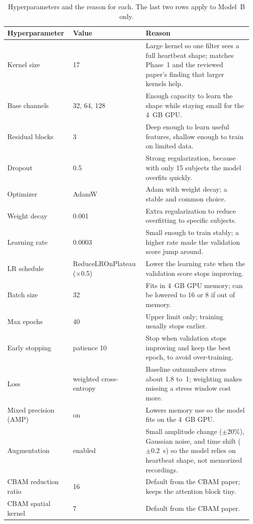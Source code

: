 \documentclass[conference]{IEEEtran}
\begin{document}
\begin{table}[t]
\caption{Hyperparameters and the reason for each. The last two rows apply to
Model~B only.}
\label{tab:hparams}
\centering
\footnotesize
\begin{tabular}{|l|l|p{11cm}|}
\hline
\textbf{Hyperparameter} & \textbf{Value} & \textbf{Reason} \\
\hline
Kernel size & 17 & Large kernel so one filter sees a full heartbeat shape; matches Phase~1 and the reviewed paper's finding that larger kernels help. \\
\hline
Base channels & 32, 64, 128 & Enough capacity to learn the shape while staying small for the 4~GB GPU. \\
\hline
Residual blocks & 3 & Deep enough to learn useful features, shallow enough to train on limited data. \\
\hline
Dropout & 0.5 & Strong regularization, because with only 15 subjects the model overfits quickly. \\
\hline
Optimizer & AdamW & Adam with weight decay; a stable and common choice. \\
\hline
Weight decay & 0.001 & Extra regularization to reduce overfitting to specific subjects. \\
\hline
Learning rate & 0.0003 & Small enough to train stably; a higher rate made the validation score jump around. \\
\hline
LR schedule & ReduceLROnPlateau ($\times$0.5) & Lower the learning rate when the validation score stops improving. \\
\hline
Batch size & 32 & Fits in 4~GB GPU memory; can be lowered to 16 or 8 if out of memory. \\
\hline
Max epochs & 40 & Upper limit only; training usually stops earlier. \\
\hline
Early stopping & patience 10 & Stop when validation stops improving and keep the best epoch, to avoid over-training. \\
\hline
Loss & weighted cross-entropy & Baseline outnumbers stress about 1.8 to~1; weighting makes missing a stress window cost more. \\
\hline
Mixed precision (AMP) & on & Lowers memory use so the model fits on the 4~GB GPU. \\
\hline
Augmentation & enabled & Small amplitude change ($\pm$20\%), Gaussian noise, and time shift ($\pm$0.2~s) so the model relies on heartbeat shape, not memorized recordings. \\
\hline
CBAM reduction ratio & 16 & Default from the CBAM paper; keeps the attention block tiny. \\
\hline
CBAM spatial kernel & 7 & Default from the CBAM paper. \\
\hline
\end{tabular}
\end{table}
\end{document}
